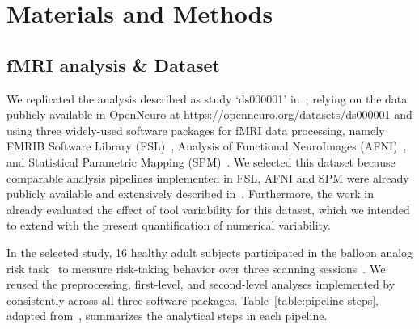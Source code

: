 \documentclass[11pt,onecolumn]{article}
\begin{document}
\section{Materials and Methods}

\subsection{fMRI analysis \& Dataset}

We replicated the analysis described as study `ds000001'
in~\cite{schonberg2012decreasing}, relying on the data publicly available
in OpenNeuro at \url{https://openneuro.org/datasets/ds000001} and using
three widely-used software packages for fMRI data processing, namely FMRIB
Software Library (FSL)~\cite{jenkinson2012fsl}, Analysis of Functional
NeuroImages (AFNI)~\cite{cox1996afni}, and Statistical Parametric
Mapping (SPM)~\cite{penny2011statistical}. We selected this dataset because
comparable analysis pipelines implemented in FSL, AFNI and SPM were already
publicly available and extensively described in~\cite{bowring2019exploring}.
Furthermore, the work in~\cite{bowring2019exploring} already evaluated the
effect of tool variability for this dataset, which we intended to
extend with the present quantification of numerical variability.

In the selected study, 16 healthy adult subjects participated in the
balloon analog risk task~\cite{lejuez2002evaluation} to measure risk-taking
behavior over three scanning sessions~\cite{schonberg2012decreasing}. We
reused the preprocessing, first-level, and second-level analyses
implemented by~\cite{bowring2019exploring} consistently across all three
software packages. Table~\ref{table:pipeline-steps}, adapted from~\cite{bowring2019exploring},
summarizes the analytical steps in each
pipeline.
\end{document}

